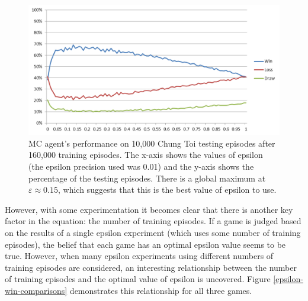 \documentclass[11pt,a4paper]{report}
\begin{document}
\begin{figure}[htbp]
	\begin{center}
		\includegraphics[width=\linewidth]{ChungToi_EpsilonResults_160kTrainingGames_10kTestingGames.png}
		\caption{MC agent's performance on 10,000 Chung Toi testing episodes after 160,000 training episodes. The x-axis shows the values of epsilon (the epsilon precision used was 0.01) and the y-axis shows the percentage of the testing episodes. There is a global maximum at $\varepsilon \approx 0.15$, which suggests that this is the best value of epsilon to use.}
		\label{chung-toi-epsilon-160ktrain-10ktest}
	\end{center}
\end{figure}

However, with some experimentation it becomes clear that there is another key factor in the equation: the number of training episodes. If a game is judged based on the results of a single epsilon experiment (which uses some number of training episodes), the belief that each game has an optimal epsilon value seems to be true. However, when many epsilon experiments using different numbers of training episodes are considered, an interesting relationship between the number of training episodes and the optimal value of epsilon is uncovered. Figure \ref{epsilon-win-comparisons} demonstrates this relationship for all three games.
\end{document}
